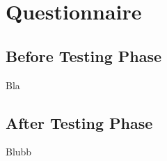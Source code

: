 \chapter{Questionnaire}
\section{Before Testing Phase}
Bla

\section{After Testing Phase}
Blubb




